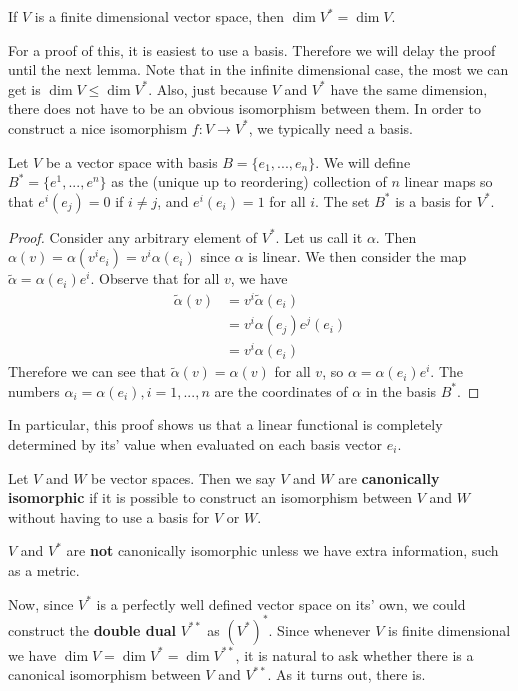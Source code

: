 \begin{thm} If $V$ is a finite dimensional vector space, then $\dim V^* = \dim V$.
\end{thm}
For a proof of this, it is easiest to use a basis. Therefore we will delay the proof until the next lemma. Note that in the infinite dimensional case, the most we can get is $\dim V \leq \dim V^*$. Also, just because $V$ and $V^*$ have the same dimension, there does not have to be an obvious isomorphism between them. In order to construct a nice isomorphism $f : V \to V^*$, we typically need a basis.
\begin{thm}
Let $V$ be a vector space with basis $B = \{e_1,...,e_n\}$. We will define $B^* = \{e^1,...,e^n\}$ as the (unique up to reordering) collection of $n$ linear maps so that $e^i(e_j) = 0$ if $i\neq j$, and $e^i(e_i)=1$ for all $i$. The set $B^*$ is a basis for $V^*$.
\end{thm}
\begin{proof}Consider any arbitrary element of $V^*$. Let us call it $\alpha$. Then $\alpha(v) = \alpha(v^i e_i) = v^i \alpha(e_i)$ since $\alpha$ is linear. We then consider the map $\tilde{\alpha} = \alpha(e_i)e^i$. Observe that for all $v$, we have 
\begin{align*}\tilde{\alpha}(v) &= v^i \tilde{\alpha}(e_i) \\&= v^i \alpha(e_j) e^j(e_i) \\&= v^i \alpha(e_i)\end{align*} Therefore we can see that $\tilde{\alpha}(v)=\alpha(v)$ for all $v$, so $\alpha = \alpha(e_i)e^i$. The numbers $\alpha_i = \alpha(e_i),i=1,...,n$ are the coordinates of $\alpha$ in the basis $B^*$.
\end{proof}
In particular, this proof shows us that a linear functional is completely determined by its' value when evaluated on each basis vector $e_i$.
\begin{defn}[Canonical]
Let $V$ and $W$ be vector spaces. Then we say $V$ and $W$ are \textbf{canonically isomorphic} if it is possible to construct an isomorphism between $V$ and $W$ without having to use a basis for $V$ or $W$.
\end{defn}
\begin{remark*}
    $V$ and $V^*$ are \textbf{not} canonically isomorphic unless we have extra information, such as a metric.
\end{remark*}

Now, since $V^*$ is a perfectly well defined vector space on its' own, we could construct the \textbf{double dual} $V^{**}$ as $(V^*)^*$. Since whenever $V$ is finite dimensional we have $\dim V = \dim V^* = \dim V^{**}$, it is natural to ask whether there is a canonical isomorphism between $V$ and $V^{**}$. As it turns out, there is.

